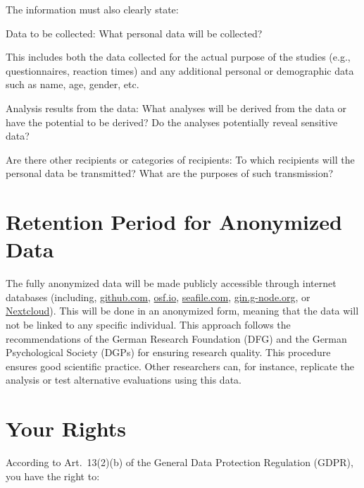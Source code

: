 \documentclass[11pt,twoside,a4paper]{article}
\begin{document}
The information must also clearly state:

Data to be collected: What personal data will be collected?

This includes both the data collected for the actual purpose of the studies (e.g., questionnaires, reaction times) and any additional personal or demographic data such as name, age, gender, etc.

Analysis results from the data: What analyses will be derived from the data or have the potential to be derived?
Do the analyses potentially reveal sensitive data?

Are there other recipients or categories of recipients: To which recipients will the personal data be transmitted?
What are the purposes of such transmission?

\section{Retention Period for Anonymized Data}

The fully anonymized data will be made publicly accessible through internet databases (including, \href{https://github.com/}{github.com}, \href{https://osf.io/}{osf.io}, \href{https://www.seafile.com/en/home/}{seafile.com}, \href{https://gin.g-node.org/}{gin.g-node.org}, or \href{https://cloud.uni-hamburg.de/}{Nextcloud}).
This will be done in an anonymized form, meaning that the data will not be linked to any specific individual.
This approach follows the recommendations of the German Research Foundation (DFG) and the German Psychological Society (DGPs) for ensuring research quality.
This procedure ensures good scientific practice.
Other researchers can, for instance, replicate the analysis or test alternative evaluations using this data.

\section*{Your Rights}

According to Art.~13(2)(b) of the General Data Protection Regulation (GDPR), you have the right to:
\end{document}
